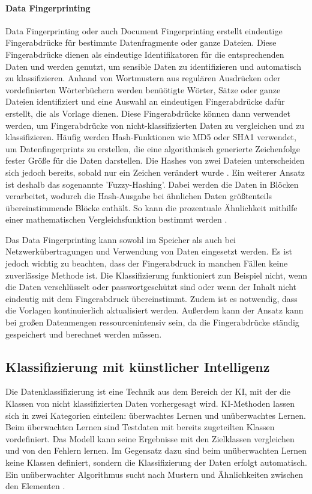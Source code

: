 \paragraph{Data Fingerprinting} \label{fingerprint}
Data Fingerprinting oder auch Document Fingerprinting erstellt eindeutige Fingerabdrücke für bestimmte Datenfragmente oder ganze Dateien. Diese Fingerabdrücke dienen als eindeutige Identifikatoren für die entsprechenden Daten und werden genutzt, um sensible Daten zu identifizieren und automatisch zu klassifizieren. Anhand von Wortmustern aus regulären Ausdrücken oder vordefinierten Wörterbüchern werden benüötigte Wörter, Sätze oder ganze Dateien identifiziert und eine Auswahl an eindeutigen Fingerabdrücke dafür erstellt, die als Vorlage dienen. Diese Fingerabdrücke können dann verwendet werden, um Fingerabdrücke von nicht-klassifizierten Daten zu vergleichen und zu klassifizieren.
Häufig werden Hash-Funktionen wie MD5 oder SHA1 verwendet, um Datenfingerprints zu erstellen, die eine algorithmisch generierte Zeichenfolge fester Größe für die Daten darstellen. Die Hashes von zwei Dateien unterscheiden sich jedoch bereits, sobald nur ein Zeichen verändert wurde \cite{Alneyadi.2016}. Ein weiterer Ansatz ist deshalb das sogenannte 'Fuzzy-Hashing'. Dabei werden die Daten in Blöcken verarbeitet, wodurch die Hash-Ausgabe bei ähnlichen Daten größtenteils übereinstimmende Blöcke enthält. So kann die prozentuale Ähnlichkeit mithilfe einer mathematischen Vergleichsfunktion bestimmt werden \cite{Shu.2015}.

Das Data Fingerprinting kann sowohl im Speicher als auch bei Netzwerkübertragungen und Verwendung von Daten eingesetzt werden. Es ist jedoch wichtig zu beachten, dass der Fingerabdruck in manchen Fällen keine zuverlässige Methode ist. Die Klassifizierung funktioniert zun Beispiel nicht, wenn die Daten verschlüsselt oder passwortgeschützt sind oder wenn der Inhalt nicht eindeutig mit dem Fingerabdruck übereinstimmt. Zudem ist es notwendig, dass die Vorlagen kontinuierlich aktualisiert werden. Außerdem kann der Ansatz kann bei großen Datenmengen ressourcenintensiv sein, da die Fingerabdrücke ständig gespeichert und berechnet werden müssen.


\subsection{Klassifizierung mit künstlicher Intelligenz}
Die Datenklassifizierung ist eine Technik aus dem Bereich der KI, mit der die Klassen von nicht klassifizierten Daten vorhergesagt wird. KI-Methoden lassen sich in zwei Kategorien einteilen: überwachtes Lernen und unüberwachtes Lernen. Beim überwachten Lernen sind Testdaten mit bereits zugeteilten Klassen vordefiniert. Das Modell kann seine Ergebnisse mit den Zielklassen vergleichen und von den Fehlern lernen. Im Gegensatz dazu sind beim unüberwachten Lernen keine Klassen definiert, sondern die Klassifizierung der Daten erfolgt automatisch. Ein unüberwachter Algorithmus sucht nach Mustern und Ähnlichkeiten zwischen den Elementen \cite{Frochte.2018b}.

